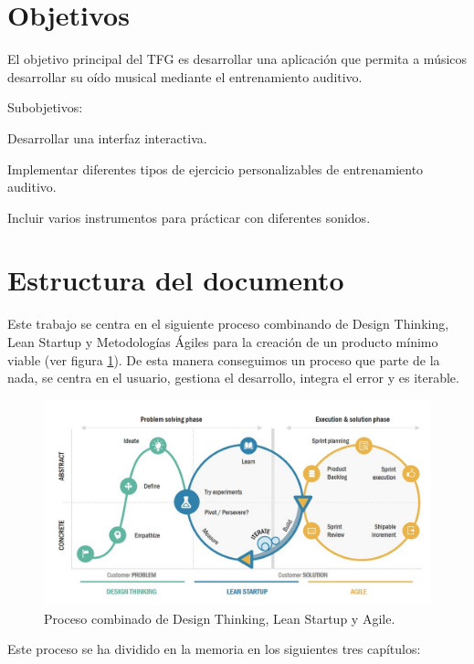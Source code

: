 \documentclass[12pt,twoside,titlepage]{report}
\begin{document}
\section{Objetivos}

El objetivo principal del TFG es desarrollar una aplicación que permita a músicos desarrollar su oído musical mediante el entrenamiento auditivo.

Subobjetivos:
\begin{compactitem}
    \item Desarrollar una interfaz interactiva.
    \item Implementar diferentes tipos de ejercicio personalizables de entrenamiento auditivo. 
    \item Incluir varios instrumentos para prácticar con diferentes sonidos.
\end{compactitem}

\section{Estructura del documento}

Este trabajo se centra en el siguiente proceso combinando de Design Thinking, Lean Startup y Metodologías Ágiles para la creación de un producto mínimo viable (ver figura \ref{fig:LeanDesignAgile}). De esta manera conseguimos un proceso que parte de la nada, se centra en el usuario, gestiona el desarrollo, integra el error y es iterable.
\cite{estructura}

\begin{figure}[H] 
    \includegraphics[scale=0.46]{LeanDesignAgile}
    \centering
    \caption{Proceso combinado de Design Thinking, Lean Startup y Agile.}
    \label{fig:LeanDesignAgile}
\end{figure}

Este proceso se ha dividido en la memoria en los siguientes tres capítulos:
\end{document}
